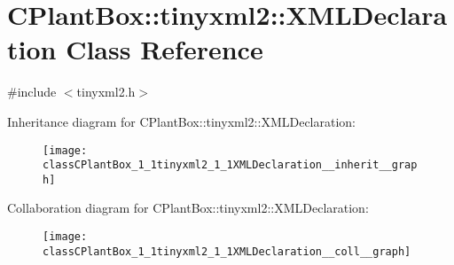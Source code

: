 \hypertarget{classCPlantBox_1_1tinyxml2_1_1XMLDeclaration}{}\section{C\+Plant\+Box\+:\+:tinyxml2\+:\+:X\+M\+L\+Declaration Class Reference}
\label{classCPlantBox_1_1tinyxml2_1_1XMLDeclaration}


{\ttfamily \#include $<$tinyxml2.\+h$>$}



Inheritance diagram for C\+Plant\+Box\+:\+:tinyxml2\+:\+:X\+M\+L\+Declaration\+:\nopagebreak
\begin{figure}[H]
\begin{center}
\leavevmode
\texttt{[image: classCPlantBox\_1\_1tinyxml2\_1\_1XMLDeclaration\_\_inherit\_\_graph]}
\end{center}
\end{figure}


Collaboration diagram for C\+Plant\+Box\+:\+:tinyxml2\+:\+:X\+M\+L\+Declaration\+:\nopagebreak
\begin{figure}[H]
\begin{center}
\leavevmode
\texttt{[image: classCPlantBox\_1\_1tinyxml2\_1\_1XMLDeclaration\_\_coll\_\_graph]}
\end{center}
\end{figure}
